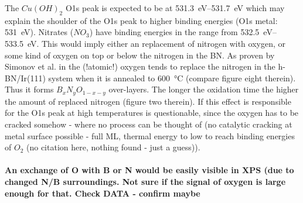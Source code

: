 The $Cu(OH)_2$ O1s peak is expected to be at \SIrange{531.3}{531.7}{\eV}\cite{deroubaix_x-ray_1992} which may explain the shoulder of the O1s peak to higher binding energies (O1s metal: \SI{531}{\eV}). Nitrates ($NO_3$) have binding energies in the range from \SIrange{532.5}{533.5}{\eV}\cite[45]{wanger_handbook_1979}. This would imply either an replacement of nitrogen with oxygen, or some kind of oxygen on top or below the nitrogen in the BN. As proven by Simonov et al. in \cite{simonov_controllable_2012} the (!atomic!) oxygen tends to replace the nitrogen in the h-BN/Ir(111) system when it is annealed to \SI{600}{\degreeCelsius} (compare figure eight therein). Thus it forms $B_{x}N_{y}O_{1-x-y}$ over-layers. The longer the oxidation time the higher the amount of replaced nitrogen (figure two therein). If this effect is responsible for the O1s peak at high temperatures is questionable, since the oxygen has to be cracked somehow - where no process can be thought of (no catalytic cracking at metal surface possible - full ML, thermal energy to low to reach binding energies of $O_2$ (no citation here, nothing found - just a guess)).
% 
% 
\paragraph{An exchange of O with B or N would be easily visible in XPS (due to changed N/B surroundings. Not sure if the signal of oxygen is large enough for that. Check DATA - confirm maybe}